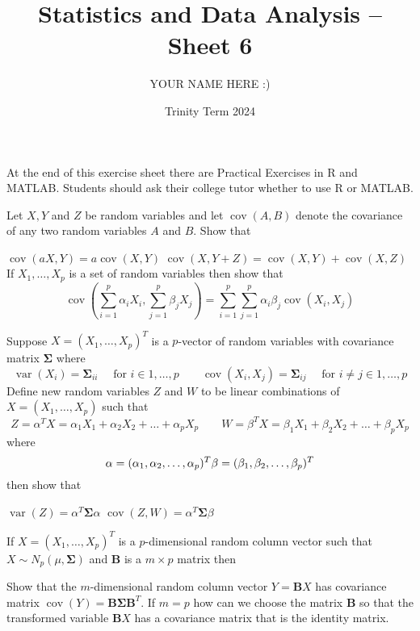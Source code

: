 \documentclass[answers]{exam}
\title{Statistics and Data Analysis -- Sheet 6}
\author{YOUR NAME HERE :)}
\date{Trinity Term 2024}
\begin{document}
\maketitle
At the end of this exercise sheet there are Practical Exercises in $\mathrm{R}$ and MATLAB. Students should ask their college tutor whether to use R or MATLAB.
\begin{questions}
\question%
Let $X, Y$ and $Z$ be random variables and let $\operatorname{cov}(A, B)$ denote the covariance of any two random variables $A$ and $B$. Show that
\begin{subparts}
\subpart $\operatorname{cov}(a X, Y)=a \operatorname{cov}(X, Y)$
\subpart $\operatorname{cov}(X, Y+Z)=\operatorname{cov}(X, Y)+\operatorname{cov}(X, Z)$
\subpart If $X_{1}, \ldots, X_{p}$ is a set of random variables then show that \[
	\operatorname{cov}\left(\sum_{i=1}^{p} \alpha_{i} X_{i}, \sum_{j=1}^{p} \beta_{j} X_{j}\right)=\sum_{i=1}^{p} \sum_{j=1}^{p} \alpha_{i} \beta_{j} \operatorname{cov}(X_{i}, X_{j})
\]
\end{subparts}



\question%
Suppose $X=\left(X_{1}, \ldots, X_{p}\right)^{T}$ is a $p$-vector of random variables with covariance matrix $\boldsymbol{\Sigma}$ where \[
	\operatorname{var}(X_{i})=\boldsymbol{\Sigma}_{ii}\quad\text{ for }i\in1,\ldots,p\qquad
	\operatorname{cov}\left(X_{i}, X_{j}\right) =\boldsymbol{\Sigma}_{i j} \quad \text { for } i \neq j \in 1, \ldots, p
\] Define new random variables $Z$ and $W$ to be linear combinations of $X=\left(X_{1}, \ldots, X_{p}\right)$ such that \[
	Z=\alpha^{T} X=\alpha_{1} X_{1}+\alpha_{2} X_{2}+\ldots+\alpha_{p} X_{p} \qquad
	W=\beta^{T} X=\beta_{1} X_{1}+\beta_{2} X_{2}+\ldots+\beta_{p} X_{p}
\] where \[
	\alpha =(\alpha_{1}, \alpha_{2}, \ldots, \alpha_{p})^{T} \\
	\beta =(\beta_{1}, \beta_{2}, \ldots, \beta_{p})^{T}
\] then show that
\begin{subparts}
\subpart $\operatorname{var}(Z)=\alpha^{T} \boldsymbol{\Sigma} \alpha$
\subpart $\operatorname{cov}(Z, W)=\alpha^{T} \boldsymbol{\Sigma} \beta$
\end{subparts}



\question%
If $X=\left(X_{1}, \ldots, X_{p}\right)^{T}$ is a $p$-dimensional random column vector such that $X \sim N_{p}(\mu, \boldsymbol{\Sigma})$ and $\boldsymbol{B}$ is a $m \times p$ matrix then
\begin{subparts}
\subpart Show that the $m$-dimensional random column vector $Y=\boldsymbol{B} X$ has covariance matrix $\operatorname{cov}(Y)=\boldsymbol{B} \boldsymbol{\Sigma} \boldsymbol{B}^{T}$.
\subpart If $m=p$ how can we choose the matrix $\boldsymbol{B}$ so that the transformed variable $\boldsymbol{B} X$ has a covariance matrix that is the identity matrix.
\end{subparts}




\end{questions}
\end{document}

